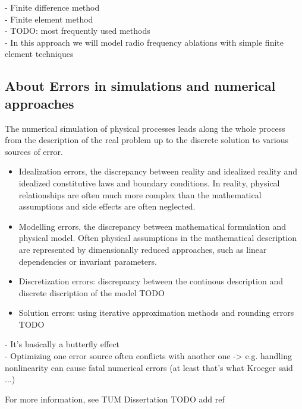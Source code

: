 \documentclass[parskip=half, titlepage=yes, 12pt, BCOR=12mm, DIV=calc]{scrartcl}
\begin{document}
- Finite difference method \\
- Finite element method \\
- TODO: most frequently used methods \\
- In this approach we will model radio frequency ablations with simple finite element techniques \\




\subsection{About Errors in simulations and numerical approaches}

The numerical simulation of physical processes leads along the whole process from the description of the real problem up to the discrete solution to various sources of error.

\begin{itemize}
    \item Idealization errors, the discrepancy between reality and idealized reality and idealized constitutive laws and boundary conditions. In reality, physical relationships are often much more complex than the mathematical assumptions and side effects are often neglected.
    \item Modelling errors, the discrepancy between mathematical formulation and physical model. Often physical assumptions in the mathematical description are represented by dimensionally reduced approaches, such as linear dependencies or invariant parameters.
    \item  Discretization errors: discrepancy between the continous description and discrete discription of the model TODO
    \item Solution errors: using iterative approximation methods and rounding errors  TODO \\
\end{itemize}


- It's basically a butterfly effect \\
- Optimizing one error source often conflicts with another one -> e.g. handling nonlinearity can cause fatal numerical errors (at least that's what Kroeger said ...)

For more information, see TUM Dissertation TODO add ref
\end{document}

